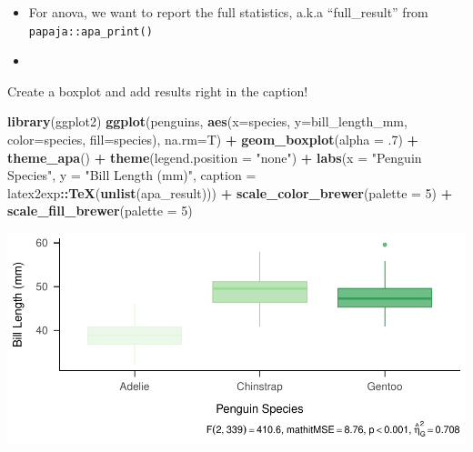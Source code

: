 \documentclass[
]{book}
\newenvironment{Shaded}{\begin{snugshade}}{\end{snugshade}}
\newcommand{\AttributeTok}[1]{\textcolor[rgb]{0.13,0.29,0.53}{#1}}
\newcommand{\DecValTok}[1]{\textcolor[rgb]{0.00,0.00,0.81}{#1}}
\newcommand{\FunctionTok}[1]{\textcolor[rgb]{0.13,0.29,0.53}{\textbf{#1}}}
\newcommand{\NormalTok}[1]{#1}
\newcommand{\OtherTok}[1]{\textcolor[rgb]{0.56,0.35,0.01}{#1}}
\newcommand{\SpecialCharTok}[1]{\textcolor[rgb]{0.81,0.36,0.00}{\textbf{#1}}}
\newcommand{\StringTok}[1]{\textcolor[rgb]{0.31,0.60,0.02}{#1}}
\begin{document}
\begin{itemize}
\item
  For anova, we want to report the full statistics, a.k.a ``full\_result'' from \texttt{papaja::apa\_print()}
\item
\begin{Shaded}
\end{Shaded}
\end{itemize}

Create a boxplot and add results right in the caption!

\begin{Shaded}
\begin{Highlighting}[]
\FunctionTok{library}\NormalTok{(ggplot2)}
\FunctionTok{ggplot}\NormalTok{(penguins, }\FunctionTok{aes}\NormalTok{(}\AttributeTok{x=}\NormalTok{species, }\AttributeTok{y=}\NormalTok{bill\_length\_mm, }\AttributeTok{color=}\NormalTok{species, }\AttributeTok{fill=}\NormalTok{species), }\AttributeTok{na.rm=}\NormalTok{T) }\SpecialCharTok{+}
  \FunctionTok{geom\_boxplot}\NormalTok{(}\AttributeTok{alpha =}\NormalTok{ .}\DecValTok{7}\NormalTok{) }\SpecialCharTok{+} \FunctionTok{theme\_apa}\NormalTok{() }\SpecialCharTok{+} \FunctionTok{theme}\NormalTok{(}\AttributeTok{legend.position =} \StringTok{"none"}\NormalTok{) }\SpecialCharTok{+}
  \FunctionTok{labs}\NormalTok{(}\AttributeTok{x =} \StringTok{"Penguin Species"}\NormalTok{, }\AttributeTok{y =} \StringTok{"Bill Length (mm)"}\NormalTok{, }
       \AttributeTok{caption =}\NormalTok{ latex2exp}\SpecialCharTok{::}\FunctionTok{TeX}\NormalTok{(}\FunctionTok{unlist}\NormalTok{(apa\_result))) }\SpecialCharTok{+}
  \FunctionTok{scale\_color\_brewer}\NormalTok{(}\AttributeTok{palette =} \DecValTok{5}\NormalTok{) }\SpecialCharTok{+}
  \FunctionTok{scale\_fill\_brewer}\NormalTok{(}\AttributeTok{palette =} \DecValTok{5}\NormalTok{)}
\end{Highlighting}
\end{Shaded}

\includegraphics{_main_files/figure-html/unnamed-chunk-86-1.pdf}
\end{document}
